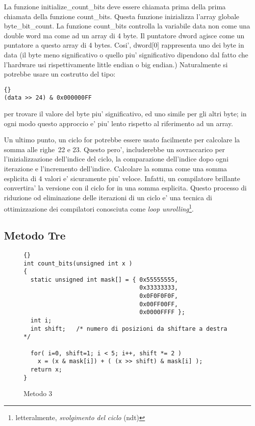La funzione {\code initialize\_count\_bits} deve essere chiamata
prima della prima chiamata della funzione {\code count\_bits}. Questa
funzione inizializza l'array globale {\code byte\_bit\_count}. La 
funzione {\code count\_bits} controlla la variabile {\code data} non
come una double word ma come ad un array di 4 byte. Il puntatore
{\code dword} agisce come un puntatore a questo array di 4 bytes.
Cosi', {\code dword[0]} rappresenta uno dei byte in {\code data}
(il byte meno significativo o quello piu' significativo dipendono
dal fatto che l'hardware usi rispettivamente little endian o big endian.)
Naturalmente si potrebbe usare un costrutto del tipo:
\begin{lstlisting}[stepnumber=0]{}
(data >> 24) & 0x000000FF
\end{lstlisting}
\noindent per trovare il valore del byte piu' significativo, ed uno
simile per gli altri byte; in ogni modo questo approccio e' piu'
lento rispetto al riferimento ad un array.

Un ultimo punto, un ciclo {\code for} potrebbe essere usato facilmente
per calcolare la somma alle righe~22 e 23. Questo pero', includerebbe
un sovraccarico per l'inizializzazione dell'indice del ciclo, la 
comparazione dell'indice dopo ogni iterazione e l'incremento dell'indice.
Calcolare la somma come una somma esplicita di 4 valori e' sicuramente
piu' veloce. Infatti, un compilatore brillante convertira' la versione
con il ciclo {\code for} in una somma esplicita. Questo processo
di riduzione od eliminazione delle iterazioni di un ciclo e' una 
tecnica di ottimizzazione dei compilatori conosciuta come
\emph{loop unrolling}\footnote{letteralmente, \emph{svolgimento del ciclo} (ndt)}.

\subsection{Metodo Tre}

\begin{figure}[t]
\begin{lstlisting}[frame=tlrb]{}
int count_bits(unsigned int x )
{
  static unsigned int mask[] = { 0x55555555,
                                 0x33333333,
                                 0x0F0F0F0F,
                                 0x00FF00FF,
                                 0x0000FFFF };
  int i;
  int shift;   /* numero di posizioni da shiftare a destra */

  for( i=0, shift=1; i < 5; i++, shift *= 2 )
    x = (x & mask[i]) + ( (x >> shift) & mask[i] );
  return x;
}
\end{lstlisting}
\caption{Metodo 3 \label{fig:method3}}
\end{figure}

